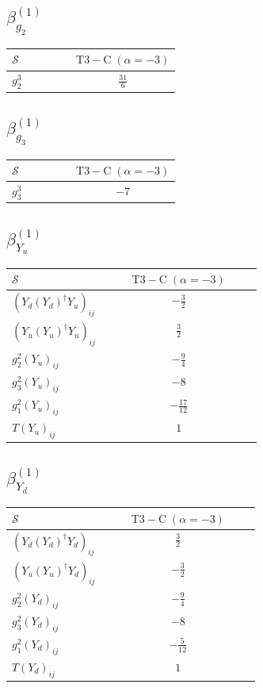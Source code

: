 \documentclass[9pt]{article}
\begin{document}
\subsection*{$ \beta_{g_2}^{(1)} $}
\begin{longtable}{@{}p{0.38\linewidth}c@{}}
\toprule
$\mathcal{S}$ & $ \mathrm{T3-C}\;(\alpha=-3) $ \\
\midrule
$ g_2^3 $ & $ \frac{31}{6} $ \\
\bottomrule
\end{longtable}
\subsection*{$ \beta_{g_3}^{(1)} $}
\begin{longtable}{@{}p{0.38\linewidth}c@{}}
\toprule
$\mathcal{S}$ & $ \mathrm{T3-C}\;(\alpha=-3) $ \\
\midrule
$ g_3^3 $ & $ -7 $ \\
\bottomrule
\end{longtable}
\subsection*{$ \beta_{Y_u}^{(1)} $}
\begin{longtable}{@{}p{0.38\linewidth}c@{}}
\toprule
$\mathcal{S}$ & $ \mathrm{T3-C}\;(\alpha=-3) $ \\
\midrule
$ (Y_d (Y_d)^{\dagger} Y_u)_{ij} $ & $ - \frac{3}{2} $ \\
$ (Y_u (Y_u)^{\dagger} Y_u)_{ij} $ & $ \frac{3}{2} $ \\
$ g_2^2 (Y_u)_{ij} $ & $ - \frac{9}{4} $ \\
$ g_3^2 (Y_u)_{ij} $ & $ -8 $ \\
$ g_1^2 (Y_u)_{ij} $ & $ - \frac{17}{12} $ \\
$ T (Y_u)_{ij} $ & $ 1 $ \\
\bottomrule
\end{longtable}
\subsection*{$ \beta_{Y_d}^{(1)} $}
\begin{longtable}{@{}p{0.38\linewidth}c@{}}
\toprule
$\mathcal{S}$ & $ \mathrm{T3-C}\;(\alpha=-3) $ \\
\midrule
$ (Y_d (Y_d)^{\dagger} Y_d)_{ij} $ & $ \frac{3}{2} $ \\
$ (Y_u (Y_u)^{\dagger} Y_d)_{ij} $ & $ - \frac{3}{2} $ \\
$ g_2^2 (Y_d)_{ij} $ & $ - \frac{9}{4} $ \\
$ g_3^2 (Y_d)_{ij} $ & $ -8 $ \\
$ g_1^2 (Y_d)_{ij} $ & $ - \frac{5}{12} $ \\
$ T (Y_d)_{ij} $ & $ 1 $ \\
\bottomrule
\end{longtable}
\end{document}

